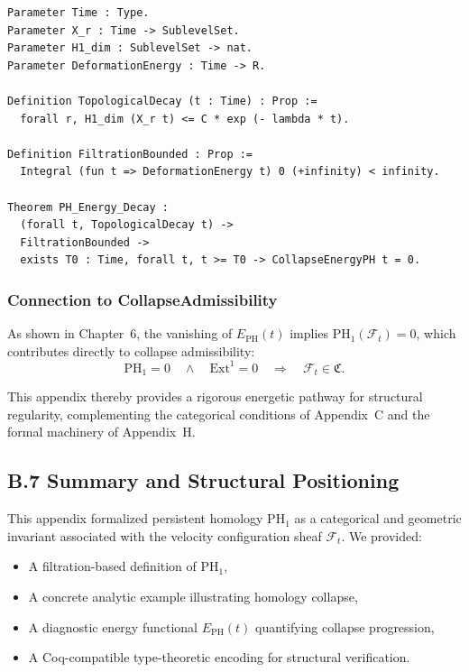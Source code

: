\documentclass[11pt]{article}
\begin{document}
\begin{lstlisting}[language=Coq, caption={Coq Encoding: PH Energy Decay Sufficient Condition}]
Parameter Time : Type.
Parameter X_r : Time -> SublevelSet.
Parameter H1_dim : SublevelSet -> nat.
Parameter DeformationEnergy : Time -> R.

Definition TopologicalDecay (t : Time) : Prop :=
  forall r, H1_dim (X_r t) <= C * exp (- lambda * t).

Definition FiltrationBounded : Prop :=
  Integral (fun t => DeformationEnergy t) 0 (+infinity) < infinity.

Theorem PH_Energy_Decay :
  (forall t, TopologicalDecay t) ->
  FiltrationBounded ->
  exists T0 : Time, forall t, t >= T0 -> CollapseEnergyPH t = 0.
\end{lstlisting}


\subsubsection*{Connection to CollapseAdmissibility}

As shown in Chapter~6, the vanishing of \( E_{\mathrm{PH}}(t) \) implies \( \mathrm{PH}_1(\mathcal{F}_t) = 0 \), which contributes directly to collapse admissibility:
\[
\mathrm{PH}_1 = 0 \quad \wedge \quad \mathrm{Ext}^1 = 0 \quad \Rightarrow \quad \mathcal{F}_t \in \mathfrak{C}.
\]

This appendix thereby provides a rigorous energetic pathway for structural regularity, complementing the categorical conditions of Appendix~C and the formal machinery of Appendix~H.



\subsection{B.7 Summary and Structural Positioning}

This appendix formalized persistent homology $\mathrm{PH}_1$ as a categorical and geometric invariant associated with the velocity configuration sheaf $\mathcal{F}_t$. We provided:

\begin{itemize}
  \item A filtration-based definition of $\mathrm{PH}_1$,
  \item A concrete analytic example illustrating homology collapse,
  \item A diagnostic energy functional $E_{\mathrm{PH}}(t)$ quantifying collapse progression,
  \item A Coq-compatible type-theoretic encoding for structural verification.
\end{itemize}
\end{document}
